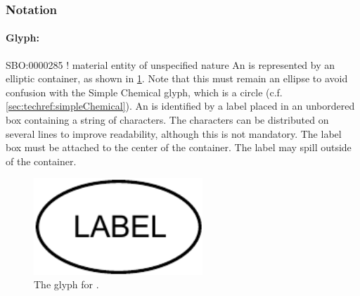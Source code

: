 \begin{valrules}
\end{valrules}


\subsubsection{Notation}

\paragraph{Glyph: }

\begin{glyphDescription}
\glyphSboTerm SBO:0000285 ! material entity of unspecified nature
\glyphContainer An  is represented by an
elliptic container, as shown in \ref{fig:techref:unspecified}.  Note that this
must remain an ellipse to avoid confusion with the Simple Chemical
glyph, which is a circle (c.f.\, \ref{sec:techref:simpleChemical}).
\glyphLabel An  is identified by a label
placed in an unbordered box containing a string of characters.  The
characters can be distributed on several lines to improve readability,
although this is not mandatory.  The label box must be attached to the
center of the container.  The label may spill outside of the
container.
\end{glyphDescription}

\begin{figure}[htb]
  \centering
  \includegraphics[width=2.5in]{images/unspecified}
  \caption{The \PD glyph for .}
  \label{fig:techref:unspecified}
\end{figure}

